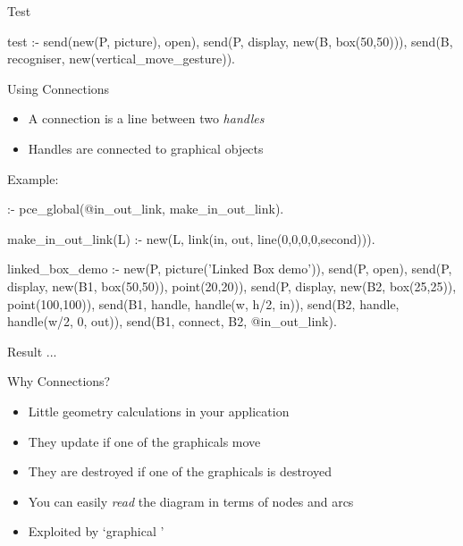 \begin{sli}{Test}

\begin{code}
test :-
        send(new(P, picture), open),
        send(P, display, new(B, box(50,50))),
        send(B, recogniser,
             new(vertical_move_gesture)).
\end{code}

\noindent
\end{sli}


\begin{sli}{Using Connections}

\begin{itemize}
    \item A connection is a line between two {\em handles}
    \item Handles are connected to graphical objects
\end{itemize}

Example:

\begin{code}
:- pce_global(@in_out_link, make_in_out_link).
        
make_in_out_link(L) :-
        new(L, link(in, out, line(0,0,0,0,second))).
        
linked_box_demo :-
        new(P, picture('Linked Box demo')),
        send(P, open),
        send(P, display,
             new(B1, box(50,50)), point(20,20)),
        send(P, display,
             new(B2, box(25,25)), point(100,100)),
        send(B1, handle, handle(w, h/2, in)),
        send(B2, handle, handle(w/2, 0, out)),
        send(B1, connect, B2, @in_out_link).
\end{code}

\noindent
\end{sli}


\begin{sli}{Result ...}


\end{sli}


\begin{sli}{Why Connections?}
\begin{itemize}
    \item Little geometry calculations in your application
    \item They update if one of the graphicals move
    \item They are destroyed if one of the graphicals is destroyed
    \item You can easily {\em read} the diagram in terms of nodes
          and arcs
    \item Exploited by `graphical '
\end{itemize}
\end{sli}



